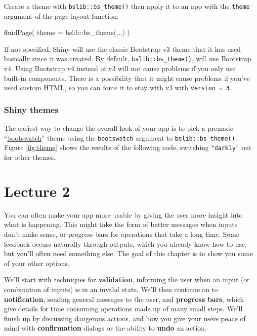 \documentclass[
]{article}
\newenvironment{Shaded}{\begin{snugshade}}{\end{snugshade}}
\newcommand{\AttributeTok}[1]{\textcolor[rgb]{0.77,0.63,0.00}{#1}}
\newcommand{\FunctionTok}[1]{\textcolor[rgb]{0.00,0.00,0.00}{#1}}
\newcommand{\NormalTok}[1]{#1}
\newcommand{\SpecialCharTok}[1]{\textcolor[rgb]{0.00,0.00,0.00}{#1}}
\begin{document}
Create a theme with \texttt{bslib::bs\_theme()} then apply it to an app with the \texttt{theme} argument of the page layout function:

\begin{Shaded}
\begin{Highlighting}[]
\FunctionTok{fluidPage}\NormalTok{(}
  \AttributeTok{theme =}\NormalTok{ bslib}\SpecialCharTok{::}\FunctionTok{bs\_theme}\NormalTok{(...)}
\NormalTok{)}
\end{Highlighting}
\end{Shaded}

If not specified, Shiny will use the classic Bootstrap v3 theme that it has used basically since it was created.
By default, \texttt{bslib::bs\_theme()}, will use Bootstrap v4.
Using Bootstrap v4 instead of v3 will not cause problems if you only use built-in components.
There is a possibility that it might cause problems if you've used custom HTML, so you can force it to stay with v3 with \texttt{version\ =\ 3}.

\hypertarget{shiny-themes}{%
\subsubsection{Shiny themes}\label{shiny-themes}}

The easiest way to change the overall look of your app is to pick a premade ``\href{https://bootswatch.com}{bootswatch}'' theme using the \texttt{bootswatch} argument to \texttt{bslib::bs\_theme()}.
Figure \ref{fig:theme} shows the results of the following code, switching \texttt{"darkly"} out for other themes.

\hypertarget{lecture2}{%
\section{Lecture 2}\label{lecture2}}

You can often make your app more usable by giving the user more insight into what is happening.
This might take the form of better messages when inputs don't make sense, or progress bars for operations that take a long time.
Some feedback occurs naturally through outputs, which you already know how to use, but you'll often need something else.
The goal of this chapter is to show you some of your other options.

We'll start with techniques for \textbf{validation}, informing the user when an input (or combination of inputs) is in an invalid state.
We'll then continue on to \textbf{notification}, sending general messages to the user, and \textbf{progress bars}, which give details for time consuming operations made up of many small steps.
We'll finish up by discussing dangerous actions, and how you give your users peace of mind with \textbf{confirmation} dialogs or the ability to \textbf{undo} an action.
\end{document}
